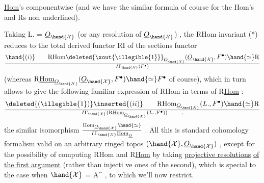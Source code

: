 
\uline{Hom}'s componentwise  (and we have the similar formula of course for the\newline
Hom's and R\allowbreak{}s  non underlined). 

Taking  L. = $\underline{O}_{\hand{\mathcal{X}}}$ (or any resolution of $\underline{O}_{\hand{\mathcal{X}}}$) ,  the RHom invariant
(*)  reduces to the total derived functor  RI  of the sections functor
\[ \hand{(i)} \qquad \mathrm{RHom}\deleted{\xout{\illegible{1}}}_{\underline{O}_{\hand{\mathcal{X}}}}(\underline{O}_{\hand{\mathcal{X}}},F^\bullet)\hand{\simeq} \mathrm{R}\over{I}{\Gamma}_{\hand{\mathcal{X}}}(F^\bullet) \]
(whereas  $\mathrm{R}\underline{\mathrm{Hom}}_{\underline{O}_{\hand{\mathcal{X}}}}(\underline{O}_{\hand{\mathcal{X}}},F^\bullet)\hand{\simeq}F^\bullet$  of course),  which in turn allows to give
the following familiar expression of RHom in terms of R\uline{Hom}  :
\[ \deleted{(\illegible{1})}\inserted{(ii)} \qquad \mathrm{RHom}_{\underline{O}_{\hand{\mathcal{X}}}}(L.,F^\bullet)\hand{\simeq} \mathrm{R}\over{I}{\Gamma}_{\hand{\mathcal{X}}}(\mathrm{R}\underline{\mathrm{Hom}}_{\underline{O}_{\hand{\mathcal{X}}}}(L.,F^\bullet)) \qquad , \]
 the similar isomorphism  $\mathrm{Hom}_{\underline{O}_{\hand{\mathcal{X}}}}\hand{\simeq}\over{I}{\Gamma}_{\hand{\mathcal{X}}}\underline{\mathrm{Hom}}_{\underline{O}}$ .  All this is
standard cohomology formalism\hand{,} valid on an arbitrary  ringed topos
$(\hand{\mathcal{X}},\underline{O}_{\hand{\mathcal{X}}})$ ,  except for the possibility of computing RHom and R\uline{Hom}  by 
taking \uline{projective resolutions} \uline{of the first argument} (rather than injecti
ve ones of the second),  which is special to the case  when $\hand{\mathcal{X}}$ = A\^{} ,
to which we'll now restrict.

